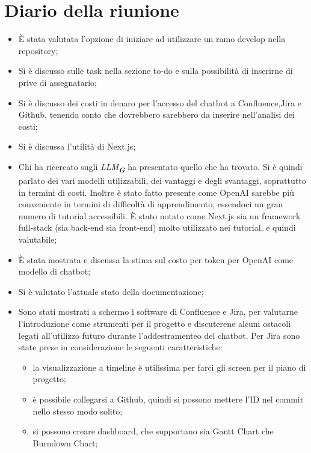 
\section{Diario della riunione}

\begin{itemize}
    \item È stata valutata l'opzione di iniziare ad utilizzare un ramo develop nella repository;
    \item Si è discusso sulle task nella sezione to-do e sulla possibilità di inserirne di prive di assegnatario;
    \item Si è discusso dei costi in denaro per l'accesso del chatbot a Confluence,Jira e Github, tenendo conto che dovrebbero sarebbero da inserire nell'analisi dei costi;
    \item Si è discussa l'utilità di Next.js;
    \item Chi ha ricercato sugli \emph{LLM}\textsubscript{\textit{\textbf{G}}} ha presentato quello che ha trovato. Si è quindi parlato dei vari modelli utilizzabili, dei vantaggi e degli svantaggi, soprattutto in termini di costi. Inoltre è stato fatto presente come OpenAI sarebbe più conveniente in termini di difficoltà di apprendimento, essendoci un gran numero di tutorial accessibili. È stato notato come Next.js sia un framework full-stack (sia back-end sia front-end) molto utilizzato nei tutorial, e quindi valutabile;
    \item È stata mostrata e discussa la stima sul costo per token per OpenAI come modello di chatbot;
    \item Si è valutato l'attuale stato della documentazione;
    \item Sono stati mostrati a schermo i software di Confluence e Jira, per valutarne l'introduzione come strumenti per il progetto e discuterene alcuni ostacoli legati all'utilizzo futuro durante l'addestramenteo del chatbot.
    Per Jira sono state prese in considerazione le seguenti caratteristiche:
    \begin{itemize}
    \item la visualizzazione a timeline è utilissima per farci gli screen per il piano di progetto;
    \item è possibile collegarsi a Github, quindi si possono mettere l'ID nel commit nello stesso modo solito;
    \item si possono creare dashboard, che supportano sia Gantt Chart che Burndown Chart;

\end{itemize}
\end{itemize}
